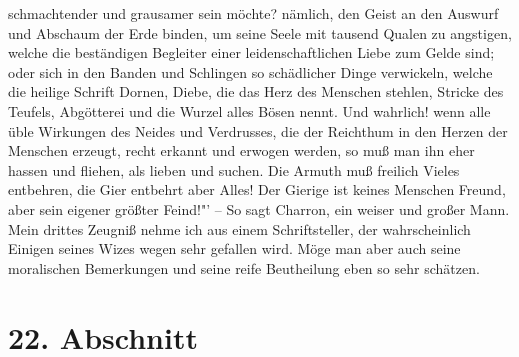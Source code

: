 {schmachtender und
grausamer sein möchte? nämlich, den Geist an den Auswurf und Abschaum der Erde
binden, um seine Seele mit tausend Qualen zu angstigen, welche die beständigen
Begleiter einer leidenschaftlichen Liebe zum Gelde sind; oder sich in den Banden
und Schlingen so schädlicher Dinge verwickeln, welche die heilige Schrift
Dornen, Diebe, die das Herz des Menschen stehlen, Stricke des Teufels,
Abgötterei und die Wurzel alles Bösen nennt. Und wahrlich! wenn alle üble
Wirkungen des Neides und Verdrusses, die der Reichthum in den Herzen der
Menschen erzeugt, recht erkannt und erwogen werden, so muß man ihn eher hassen
und fliehen, als lieben und suchen. Die Armuth muß freilich Vieles entbehren,
die Gier entbehrt aber Alles! Der Gierige ist keines Menschen Freund, aber sein
eigener größter Feind!"'} -- So sagt Charron, ein
weiser und großer Mann. Mein
drittes Zeugniß nehme ich aus einem Schriftsteller, der wahrscheinlich Einigen
seines Wizes wegen sehr gefallen wird. Möge man aber auch seine moralischen
Bemerkungen und seine reife Beutheilung eben so sehr schätzen.

\section{22. Abschnitt} \label{kap13_ab22}

